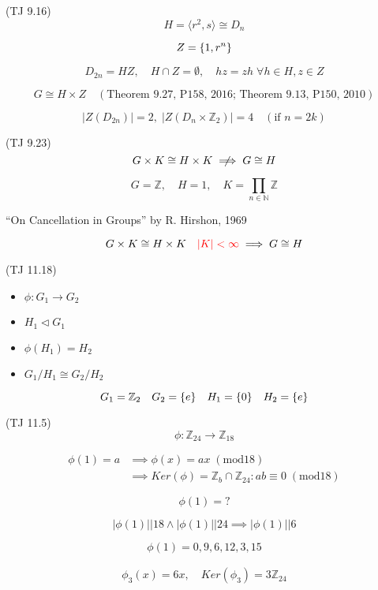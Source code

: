\begin{frame}{(TJ 9.16)}
  \[
    H = \langle r^2, s \rangle \cong D_{n}
  \]

  \[
    Z = \{1, r^n\}
  \]

  \[
    D_{2n} = HZ,\quad H \cap Z = \emptyset,\quad hz = zh\; \forall h \in H, z \in Z
  \]

  \[
    G \cong H \times Z\quad (\textrm{Theorem 9.27, P158, 2016; Theorem 9.13, P150, 2010})
  \]

  \[
    |Z(D_{2n})| = 2,\; |Z(D_n \times \mathbb{Z}_{2})| = 4\quad (\textrm{if } n = 2k)
  \]
\end{frame}
\begin{frame}{(TJ 9.23)}
  \[
    G \times K \cong H \times K \centernot\implies G \cong H
  \]

  \[
    G = \mathbb{Z}, \quad H = {1}, \quad K = \prod_{n \in \mathbb{N}} \mathbb{Z}
  \]

  \centerline{``On Cancellation in Groups'' by R. Hirshon, 1969}

  \[
    G \times K \cong H \times K \quad \textcolor{red}{|K| < \infty} \implies G \cong H
  \]
\end{frame}
\begin{frame}{(TJ 11.18)}
  \begin{itemize}
    \item $\phi: G_1 \to G_2$
    \item $H_1 \triangleleft G_1$
    \item $\phi(H_1) = H_2$
    \item $G_1/H_1 \cong G_2/H_2$
  \end{itemize}

  \[
    G_1 = \mathbb{Z}_{2} \quad G_2 = \{e\} \quad H_1 = \{0\} \quad H_2 = \{e\}
  \]
\end{frame}
\begin{frame}{(TJ 11.5)}
  \[
    \phi: \mathbb{Z}_{24} \to \mathbb{Z}_{18}
  \]

  \begin{align*}
    \phi(1) = a & \implies \phi(x) = ax\; (\mathrm{mod} 18) \\
	    & \implies Ker(\phi) = \mathbb{Z}_{b} \cap \mathbb{Z}_{24}: ab \equiv 0\; (\mathrm{mod} 18)
  \end{align*}

  \[
    \phi(1) = ?
  \]

  \[
    |\phi(1)| | 18 \land |\phi(1)| | 24 \implies |\phi(1)| | 6
  \]

  \[
    \phi(1) = 0, 9, 6, 12, 3, 15
  \]

  \begin{align*}
    \phi_3(x) = 6x, \quad Ker(\phi_{3}) = 3\mathbb{Z}_{24}
  \end{align*}
\end{frame}

